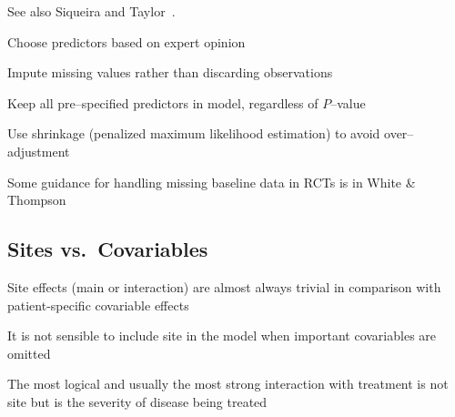  See also Siqueira and Taylor~\cite{sig99tre}.
\item   Choose predictors based on expert opinion \ipacue
\item   Impute missing values rather than discarding observations
\item   Keep all pre--specified predictors in model, regardless of $P$--value
\item   Use shrinkage (penalized maximum likelihood estimation) to avoid over--adjustment
\item Some guidance for handling missing baseline data in RCTs is in White \& Thompson~\cite{whi05adj}
\ei

\subsection{Sites vs.\ Covariables}
\bi
\item Site effects (main or interaction) are almost always trivial in comparison with patient-specific covariable effects
\item It is not sensible to include site in the model when important covariables are omitted
\item The most logical and usually the most strong interaction with treatment is not site but is the severity of disease being treated
\ei

